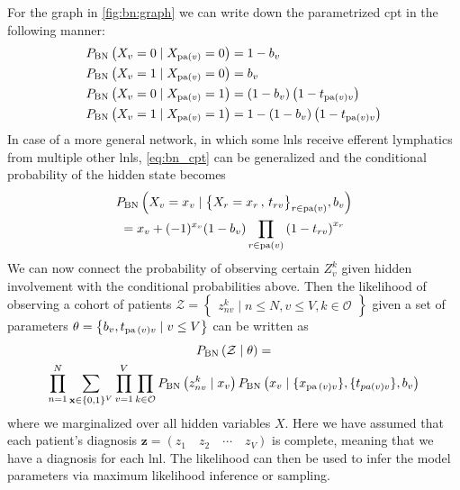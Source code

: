 \documentclass[\relativeRoot/main.tex]{subfiles}
\begin{document}
For the graph in \cref{fig:bn:graph} we can write down the parametrized \gls{cpt} in the following manner:
%
\begin{equation} \label{eq:bn_cpt}
    \begin{aligned}
        P_\text{BN} \left( X_v = 0 \mid X_{\operatorname{pa}(v)} = 0 \right) &= 1 - b_v \\
        P_\text{BN} \left( X_v = 1 \mid X_{\operatorname{pa}(v)} = 0 \right) &= b_v \\
        P_\text{BN} \left( X_v = 0 \mid X_{\operatorname{pa}(v)} = 1 \right) &= (1 - b_v) \left(1 - t_{\operatorname{pa}(v)v}\right) \\
        P_\text{BN} \left( X_v = 1 \mid X_{\operatorname{pa}(v)} = 1 \right) &= 1 - (1 - b_v) \left(1 - t_{\operatorname{pa}(v)v}\right) 
    \end{aligned}
\end{equation}
%
In case of a more general network, in which some \glspl{lnl} receive efferent lymphatics from multiple other \glspl{lnl}, \cref{eq:bn_cpt} can be generalized and the conditional probability of the hidden state becomes
%
\begin{multline}
    P_\text{BN} \left( X_v = x_v \mid \big\{ X_r = x_r \,,\, t_{rv} \big\}_{r \in \operatorname{pa}(v)} , b_v \right) \\
    = x_v + (-1)^{x_v} (1 - b_v) \prod_{r \in \operatorname{pa}(v)}{\left( 1 - t_{rv} \right)}^{x_r}
\end{multline}
%
We can now connect the probability of observing certain $Z_v^k$ given hidden involvement with the conditional probabilities above. Then the likelihood of observing a cohort of patients $\mathcal{Z} = \begin{Bmatrix} z_{nv}^k \mid n \leq N, v \leq V, k \in \mathcal{O} \end{Bmatrix}$ given a set of parameters $\theta = \begin{Bmatrix} b_v, t_{\operatorname{pa}{(v)}v} \mid v \leq V \end{Bmatrix}$ can be written as
%
\begin{multline} \label{eq:bn:likelihood}
    P_\text{BN}\left( \mathcal{Z} \mid \theta \right) =\\
    \prod_{n=1}^N{ \sum_{\mathbf{x} \in \{ 0,1 \}^V }{\prod_{v=1}^V{ \prod_{k \in \mathcal{O}}{ P_\text{BN} \left( z_{nv}^k \mid x_v \right) P_\text{BN} \left(  x_v \mid \{ x_{\operatorname{pa}{(v)}v} \}, \{ t_{pa{(v)}v} \}, b_v  \right) } } } }
\end{multline}
%
where we marginalized over all hidden variables $X$. Here we have assumed that each patient's diagnosis $\mathbf{z} = \left( z_1 \quad z_2 \quad \cdots \quad z_V \right)$ is complete, meaning that we have a diagnosis for each \gls{lnl}. The likelihood can then be used to infer the model parameters via maximum likelihood inference or sampling.
\end{document}
